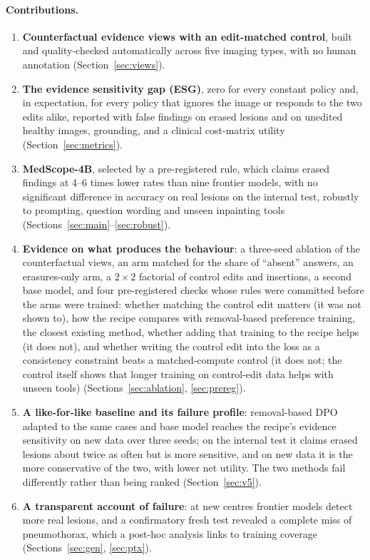 \documentclass[11pt]{article}
\begin{document}
\paragraph{Contributions.}
\begin{enumerate}[leftmargin=*,nosep]
\item \textbf{Counterfactual evidence views with an edit-matched control}, built and quality-checked automatically across five imaging types, with no human annotation (Section~\ref{sec:views}).
\item \textbf{The evidence sensitivity gap (ESG)}, zero for every constant policy and, in expectation, for every policy that ignores the image or responds to the two edits alike, reported with false findings on erased lesions and on unedited healthy images, grounding, and a clinical cost-matrix utility (Section~\ref{sec:metrics}).
\item \textbf{MedScope-4B}, selected by a pre-registered rule, which claims erased findings at 4--6 times lower rates than nine frontier models, with no significant difference in accuracy on real lesions on the internal test, robustly to prompting, question wording and unseen inpainting tools (Sections~\ref{sec:main}--\ref{sec:robust}).
\item \textbf{Evidence on what produces the behaviour}: a three-seed ablation of the counterfactual views, an arm matched for the share of ``absent'' answers, an erasures-only arm, a $2\times2$ factorial of control edits and insertions, a second base model, and four pre-registered checks whose rules were committed before the arms were trained: whether matching the control edit matters (it was not shown to), how the recipe compares with removal-based preference training, the closest existing method, whether adding that training to the recipe helps (it does not), and whether writing the control edit into the loss as a consistency constraint beats a matched-compute control (it does not; the control itself shows that longer training on control-edit data helps with unseen tools) (Sections~\ref{sec:ablation}, \ref{sec:prereg}).
\item \textbf{A like-for-like baseline and its failure profile}: removal-based DPO adapted to the same cases and base model reaches the recipe's evidence sensitivity on new data over three seeds; on the internal test it claims erased lesions about twice as often but is more sensitive, and on new data it is the more conservative of the two, with lower net utility. The two methods fail differently rather than being ranked (Section~\ref{sec:v5}).
\item \textbf{A transparent account of failure}: at new centres frontier models detect more real lesions, and a confirmatory fresh test revealed a complete miss of pneumothorax, which a post-hoc analysis links to training coverage (Sections~\ref{sec:gen}, \ref{sec:ptx}).
\end{enumerate}
\end{document}

